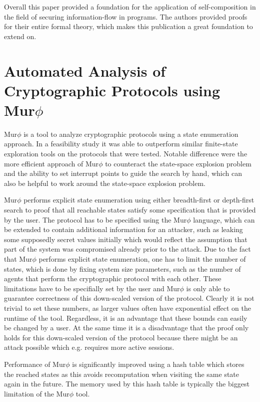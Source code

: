\documentclass[a4paper,UKenglish]{lipics-v2018}
\def\murphi{Mur$\phi$ }
\begin{document}
Overall this paper provided a foundation for the application of self-composition in the field of securing information-flow in programs. The authors provided proofs for their entire formal theory, which makes this publication a great foundation to extend on.




\section{Automated Analysis of Cryptographic Protocols using \murphi}

\murphi is a tool to analyze cryptographic protocols using a state enumeration approach. In a feasibility study it was able to outperform similar finite-state exploration tools on the protocols that were tested. Notable difference were the more efficient approach of \murphi to counteract the state-space explosion problem and the ability to set interrupt points to guide the search by hand, which can also be helpful to work around the state-space explosion problem.\cite{murphi}

\murphi performs explicit state enumeration using either breadth-first or depth-first search to proof that all reachable states satisfy some specification that is provided by the user. The protocol has to be specified using the \murphi language, which can be extended to contain additional information for an attacker, such as leaking some supposedly secret values initially which would reflect the assumption that part of the system was compromised already prior to the attack. Due to the fact that \murphi performs explicit state enumeration, one has to limit the number of states, which is done by fixing system size parameters, such as the number of agents that perform the cryptographic protocol with each other. These limitations have to be specifially set by the user and \murphi is only able to guarantee correctness of this down-scaled version of the protocol. Clearly it is not trivial to set these numbers, as larger values often have exponential effect on the runtime of the tool.\cite{murphi} Regardless, it is an advantage that these bounds can easily be changed by a user. At the same time it is a disadvantage that the proof only holds for this down-scaled version of the protocol because there might be an attack possible which e.g. requires more active sessions.

Performance of \murphi is significantly improved using a hash table which stores the reached states as this avoids recomputation when visiting the same state again in the future. The memory used by this hash table is typically the biggest limitation of the \murphi tool.\cite{murphi}
\end{document}
